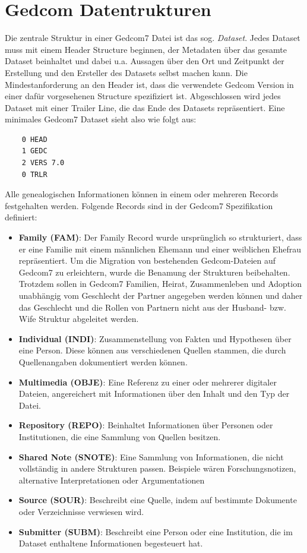 \section{Gedcom Datentrukturen}
\label{sec: Konzept - Gedcom Strukturen}
Die zentrale Struktur in einer Gedcom7 Datei ist das sog. \textit{Dataset}. Jedes Dataset muss mit einem Header Structure beginnen, der Metadaten über das gesamte Dataset beinhaltet und dabei u.a. Aussagen über den Ort und Zeitpunkt der Erstellung und den Ersteller des Datasets selbst machen kann. Die Mindestanforderung an den Header ist, dass die verwendete Gedcom Version in einer dafür vorgesehenen Structure spezifiziert ist. Abgeschlossen wird jedes Dataset mit einer Trailer Line, die das Ende des Datasets repräsentiert. Eine minimales Gedcom7 Dataset sieht also wie folgt aus:
\newpage
{
\begin{lstlisting}
	0 HEAD
	1 GEDC
	2 VERS 7.0
	0 TRLR
\end{lstlisting}
\label{lst: minimales dataset}
}
\vspace{1em}
Alle genealogischen Informationen können in einem oder mehreren Records festgehalten werden. Folgende Records sind in der Gedcom7 Spezifikation definiert:
\begin{itemize}
	\label{liste records}
	\item \textbf{Family (FAM)}: Der Family Record wurde ursprünglich so strukturiert, dass er eine Familie mit einem männlichen Ehemann und einer weiblichen Ehefrau repräsentiert. Um die Migration von bestehenden Gedcom-Dateien auf Gedcom7 zu erleichtern, wurde die Benamung der Strukturen beibehalten. Trotzdem sollen in Gedcom7 Familien, Heirat, Zusammenleben und Adoption unabhängig vom Geschlecht der Partner angegeben werden können und daher das Geschlecht und die Rollen von Partnern nicht aus der Husband- bzw. Wife Struktur abgeleitet werden.
	\item \textbf{Individual (INDI)}: Zusammenstellung von Fakten und Hypothesen über eine Person. Diese können aus verschiedenen Quellen stammen, die durch Quellenangaben dokumentiert werden können.
	\item \textbf{Multimedia (OBJE)}: Eine Referenz zu einer oder mehrerer digitaler Dateien, angereichert mit Informationen über den Inhalt und den Typ der Datei.
	\item \textbf{Repository (REPO)}: Beinhaltet Informationen über Personen oder Institutionen, die eine Sammlung von Quellen besitzen.
	\item \textbf{Shared Note (SNOTE)}: Eine Sammlung von Informationen, die nicht vollständig in andere Strukturen passen. Beispiele wären Forschungsnotizen, alternative Interpretationen oder Argumentationen
	\item \textbf{Source (SOUR)}: Beschreibt eine Quelle, indem auf bestimmte Dokumente oder Verzeichnisse verwiesen wird.
	\item \textbf{Submitter (SUBM)}: Beschreibt eine Person oder eine Institution, die im Dataset enthaltene Informationen begesteuert hat.
\end{itemize}
